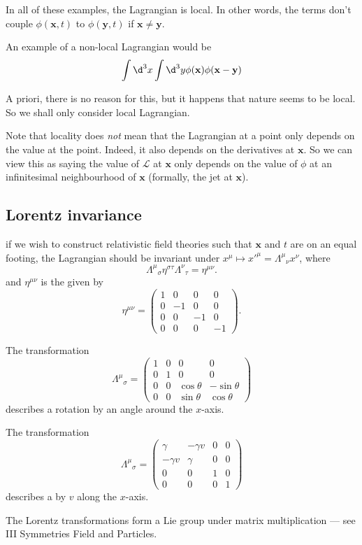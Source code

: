 \documentclass[a4paper]{article}
\begin{document}
In all of these examples, the Lagrangian is local. In other words, the terms don't couple $\phi(\mathbf{x}, t)$ to $\phi(\mathbf{y}, t)$ if $\mathbf{x} \not= \mathbf{y}$.
\begin{eg}
  An example of a non-local Lagrangian would be
  \[
    \int \d^3 x \int \d^3 y \phi(\mathbf{x}) \phi(\mathbf{x} - \mathbf{y})
  \]
\end{eg}
A priori, there is no reason for this, but it happens that nature seems to be local. So we shall only consider local Lagrangian.

Note that locality does \emph{not} mean that the Lagrangian at a point only depends on the value at the point. Indeed, it also depends on the derivatives at $\mathbf{x}$. So we can view this as saying the value of $\mathcal{L}$ at $\mathbf{x}$ only depends on the value of $\phi$ at an infinitesimal neighbourhood of $\mathbf{x}$ (formally, the jet at $\mathbf{x}$).

\subsection{Lorentz invariance}
if we wish to construct relativistic field theories such that $\mathbf{x}$ and $t$ are on an equal footing, the Lagrangian should be invariant under  $x^\mu \mapsto x'^\mu = \Lambda^\mu\!_\nu x^\nu$, where
\[
  \Lambda^\mu\!_\sigma \eta^{\sigma\tau} \Lambda^\nu\!_\tau = \eta^{\mu\nu}.
\]
and $\eta^{\mu\nu}$ is the  given by
\[
  \eta^{\mu\nu} =
  \begin{pmatrix}
    1 & 0 & 0 & 0\\
    0 & -1 & 0 & 0\\
    0 & 0 & -1 & 0\\
    0 & 0 & 0 & -1
  \end{pmatrix}.
\]

\begin{eg}
  The transformation
  \[
    \Lambda^\mu\!_\sigma =
    \begin{pmatrix}
      1 & 0 & 0 & 0\\
      0 & 1 & 0 & 0\\
      0 & 0 & \cos \theta & -\sin \theta\\
      0 & 0 & \sin \theta & \cos \theta
    \end{pmatrix}
  \]
  describes a rotation by an angle around the $x$-axis.
\end{eg}

\begin{eg}
  The transformation
  \[
    \Lambda^\mu\!_\sigma =
    \begin{pmatrix}
      \gamma & -\gamma v & 0 & 0\\
      -\gamma v & \gamma & 0 & 0\\
      0 & 0 & 1 & 0\\
      0 & 0 & 0 & 1
    \end{pmatrix}
  \]
  describes a  by $v$ along the $x$-axis.
\end{eg}
The Lorentz transformations form a Lie group under matrix multiplication --- see III Symmetries Field and Particles.
\end{document}
